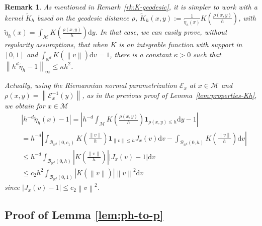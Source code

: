 \documentclass[10pt,a4paper]{article}
\newcommand{\ind}{{\mathbf 1}}
\newcommand\cB{\mathcal{B}}
\newcommand\cE{\mathcal{E}}
\newcommand\cM{\mathcal{M}}
\newcommand\dR{\mathbb{R}}
\newcommand\dd{\mathrm{d}}
\newcommand{\ABS}[1]{{{\left| #1 \right|}}} %
\newcommand{\NRM}[1]{{{\left\| #1\right\|}}} %
\newcommand{\PAR}[1]{{{\left(#1\right)}}} %
\newtheorem{remark}[theorem]{Remark}
\begin{document}
\begin{remark}\label{rk:K-geodesic-appendix}
   As mentioned in Remark~\ref{rk:K-geodesic},
    it is simpler to work with a kernel $\widetilde{K}_h$ based on the geodesic distance $\rho$, $\widetilde{K}_h(x,y):=\frac{1}{\tilde{\eta}_h(x)}K\PAR{\frac{\rho(x,y)}{h}}$, 
with $\widetilde{\eta}_h(x)=\int_\cM K\PAR{\frac{\rho(x,y)}{h}}\dd y $. In that case, we can easily prove, without regularity assumptions, that when $K$ is an integrable function with support in $[0,1]$ and 
$\int_{\dR^d}K\PAR{\NRM{v}}\dd v=1$,
there is a constant $\kappa>0$ such that
$\NRM{h^d\widetilde{\eta}_h-1}_{\infty}\le \kappa h^2$.

\medskip
Actually, using 
 the Riemannian normal parametrization $\cE_x$ at $x\in\cM$ and $\rho(x,y)=\NRM{\cE^{-1}_x(y)}$, as in the previous proof of Lemma~\ref{lem:properties-Kh}, we obtain for $x\in\cM$
\begin{align*}
    &\ABS{h^{-d}\widetilde{\eta}_h(x)-1}=\ABS{h^{-d}\int_\cM K\PAR{\frac{\rho(x,y)}{h}}\ind_{\rho(x,y)\le h}\dd y-1}\\
&=h^{-d}\ABS{\int_{\cB_{\dR^d}(0,c_1)} K\PAR{\frac{\NRM{v}}{h}}\ind_{\NRM{v}\le h}J_x(v)\dd v-\int_{\cB_{\dR^d}(0,h)}K\PAR{\frac{\NRM{v}}{h}}\dd v}\\
&\le h^{-d}\int_{\cB_{\dR^d}(0,h)}\ABS{K\PAR{\frac{\NRM{v}}{h}}}\ABS{J_x(v)-1}\dd v\\
&\le c_2h^{2}\int_{\cB_{\dR^d}(0,1)}\ABS{K\PAR{\NRM{v}}}\NRM{v}^2\dd v
\end{align*}
since $\ABS{J_x(v)-1}\le c_2 \NRM{v}^2$. 
\end{remark}



\subsection{Proof of Lemma \ref{lem:ph-to-p}}\label{A:proof-ph}
\end{document}
